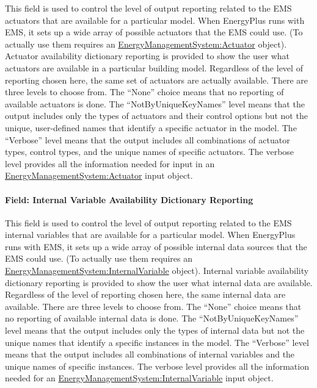 This field is used to control the level of output reporting related to the EMS actuators that are available for a particular model. When EnergyPlus runs with EMS, it sets up a wide array of possible actuators that the EMS could use. (To actually use them requires an \hyperref[energymanagementsystemactuator]{EnergyManagementSystem:Actuator} object). Actuator availability dictionary reporting is provided to show the user what actuators are available in a particular building model. Regardless of the level of reporting chosen here, the same set of actuators are actually available. There are three levels to choose from. The ``None'' choice means that no reporting of available actuators is done. The ``NotByUniqueKeyNames'' level means that the output includes only the types of actuators and their control options but not the unique, user-defined names that identify a specific actuator in the model. The ``Verbose'' level means that the output includes all combinations of actuator types, control types, and the unique names of specific actuators. The verbose level provides all the information needed for input in an \hyperref[energymanagementsystemactuator]{EnergyManagementSystem:Actuator} input object.

\paragraph{Field: Internal Variable Availability Dictionary Reporting}\label{field-internal-variable-availability-dictionary-reporting}

This field is used to control the level of output reporting related to the EMS internal variables that are available for a particular model. When EnergyPlus runs with EMS, it sets up a wide array of possible internal data sources that the EMS could use. (To actually use them requires an \hyperref[energymanagementsysteminternalvariable]{EnergyManagementSystem:InternalVariable} object). Internal variable availability dictionary reporting is provided to show the user what internal data are available. Regardless of the level of reporting chosen here, the same internal data are available. There are three levels to choose from. The ``None'' choice means that no reporting of available internal data is done. The ``NotByUniqueKeyNames'' level means that the output includes only the types of internal data but not the unique names that identify a specific instances in the model. The ``Verbose'' level means that the output includes all combinations of internal variables and the unique names of specific instances. The verbose level provides all the information needed for an \hyperref[energymanagementsysteminternalvariable]{EnergyManagementSystem:InternalVariable} input object.

